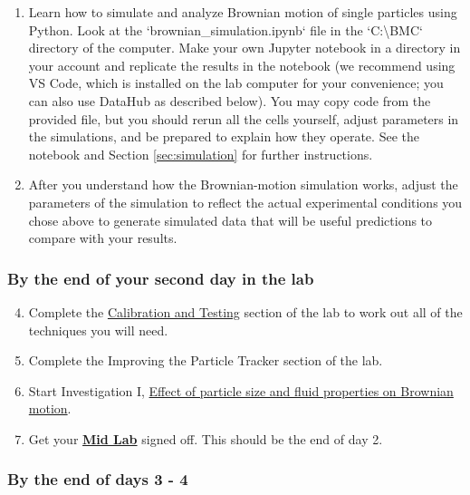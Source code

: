 \documentclass{../lab}
\begin{document}
\begin{enumerate}
    \item Learn how to simulate and analyze Brownian motion of single particles using Python. Look at the `brownian\_simulation.ipynb` file in the `C:\textbackslash BMC` directory of the computer. Make your own Jupyter notebook in a directory in your account and replicate the results in the notebook (we recommend using VS Code, which is installed on the lab computer for your convenience; you can also use DataHub as described below). You may copy code from the provided file, but you should rerun all the cells yourself, adjust parameters in the simulations, and be prepared to explain how they operate. See the notebook and Section \ref{sec:simulation} for further instructions.
    
    \item After you understand how the Brownian-motion simulation works, adjust the parameters of the simulation to reflect the actual experimental conditions you chose above to generate simulated data that will be useful predictions to compare with your results.
\end{enumerate}

\subsubsection{By the end of your second day in the lab}

\begin{enumerate}
    \setcounter{enumi}{3}
    \item Complete the \hyperref[sec:CalibrationAndTesting]{Calibration and Testing} section of the lab to work out all of the techniques you will need.

    \item Complete the Improving the Particle Tracker section of the lab.
    
    \item Start Investigation I, \hyperref[sec:InvestigationI]{Effect of particle size and fluid properties on Brownian motion}.
    
    \item Get your \href{https://berkeley-physics111b.github.io/assets/pdf/manuals/BMC_Signatures.pdf}{\textbf{Mid Lab}} signed off. This should be the end of day 2.
\end{enumerate}

\subsubsection{By the end of days 3 - 4}
\end{document}
